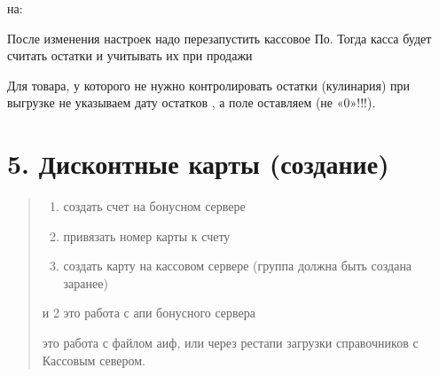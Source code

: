 \documentclass[a4paper,10pt,russian]{report}
\begin{document}
\begin{sphinxVerbatim}[commandchars=\\\{\}]
  
  
\end{sphinxVerbatim}

\sphinxAtStartPar
на:

\begin{sphinxVerbatim}[commandchars=\\\{\}]
  
  
\end{sphinxVerbatim}

\sphinxAtStartPar
После изменения настроек надо перезапустить кассовое По.
Тогда касса будет считать остатки и учитывать их при продажи

\sphinxAtStartPar
Для товара, у которого не нужно контролировать остатки (кулинария) при выгрузке не указываем дату остатков \sphinxhyphen{} , а поле 
оставляем  (не «0»!!!).


\section{5. Дисконтные карты (создание)}
\label{\detokenize{additional:id5}}\begin{quote}
\begin{enumerate}
%
\item {} 
\sphinxAtStartPar
создать счет на бонусном сервере

\item {} 
\sphinxAtStartPar
привязать номер карты к счету

\item {} 
\sphinxAtStartPar
создать карту на кассовом сервере (группа должна быть создана заранее)

\end{enumerate}

 и 2 это работа с апи бонусного сервера

 это работа с файлом аиф, или через рестапи загрузки справочников с Кассовым севером.

\sphinxAtStartPar
{}
\end{quote}
\end{document}
